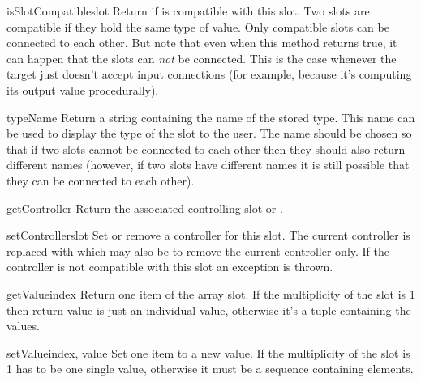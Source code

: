 \begin{methoddesc}{isSlotCompatible}{slot}
Return  if  is compatible with this slot. Two slots are
compatible if they hold the same type of value. Only compatible slots can be
connected to each other. But note that even when this method returns
true, it can happen that the slots can {\it not} be connected. This is the
case whenever the target just doesn't accept input connections (for
example, because it's computing its output value procedurally).
\end{methoddesc}

\begin{methoddesc}{typeName}{}
Return a string containing the name of the stored type. This name can
be used to display the type of the slot to the user. The name should
be chosen so that if two slots cannot be connected to each other then
they should also return different names (however, if two slots have
different names it is still possible that they can be connected to each
other).
\end{methoddesc}

\begin{methoddesc}{getController}{}
Return the associated controlling slot or .
\end{methoddesc}

\begin{methoddesc}{setController}{slot}
Set or remove a controller for this slot.  The current controller is
replaced with  which may also be  to remove the
current controller only. If the controller is not compatible with this
slot an  exception is thrown. 
\end{methoddesc}

\begin{methoddesc}{getValue}{index}
Return one item of the array slot. If the multiplicity of the slot is 1
then return value is just an individual value, otherwise it's a tuple
containing the values.
\end{methoddesc}

\begin{methoddesc}{setValue}{index, value}
Set one item to a new value. If the multiplicity of the slot is 1 
has to be one single value, otherwise it must be a sequence containing
 elements.
\end{methoddesc}

